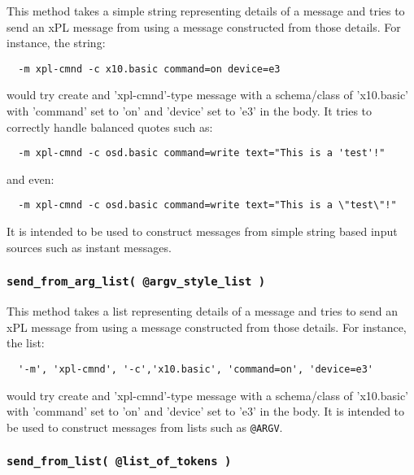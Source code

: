 \documentclass[12pt,a4paper]{article}
\begin{document}
This method takes a simple string representing details of a message
and tries to send an xPL message from using a message constructed
from those details.  For instance, the string:

\begin{verbatim}
  -m xpl-cmnd -c x10.basic command=on device=e3
\end{verbatim}


would try create and 'xpl-cmnd'-type message with a schema/class of
'x10.basic' with 'command' set to 'on' and 'device' set to 'e3' in the
body.  It tries to correctly handle balanced quotes such as:

\begin{verbatim}
  -m xpl-cmnd -c osd.basic command=write text="This is a 'test'!"
\end{verbatim}


and even:

\begin{verbatim}
  -m xpl-cmnd -c osd.basic command=write text="This is a \"test\"!"
\end{verbatim}


It is intended to be used to construct messages from simple string
based input sources such as instant messages.

\subsubsection*{\texttt{send\_from\_arg\_list( @argv\_style\_list )}\label{xPL::Listener_send_from_arg_list_argv_style_list_}}


This method takes a list representing details of a message
and tries to send an xPL message from using a message constructed
from those details.  For instance, the list:

\begin{verbatim}
  '-m', 'xpl-cmnd', '-c','x10.basic', 'command=on', 'device=e3'
\end{verbatim}


would try create and 'xpl-cmnd'-type message with a schema/class of
'x10.basic' with 'command' set to 'on' and 'device' set to 'e3' in the
body.  It is intended to be used to construct messages from lists
such as \texttt{@ARGV}.

\subsubsection*{\texttt{send\_from\_list( @list\_of\_tokens )}\label{xPL::Listener_send_from_list_list_of_tokens_}}
\end{document}
